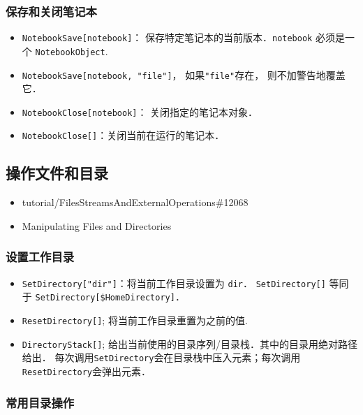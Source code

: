 \subsubsection{保存和关闭笔记本}

\begin{itemize}
\item \verb`NotebookSave[notebook]`： 保存特定笔记本的当前版本．\verb`notebook` 必须是一个 \verb`NotebookObject`.
\item \verb`NotebookSave[notebook, "file"]`， 如果\verb`"file"`存在， 则不加警告地覆盖它．
\item \verb`NotebookClose[notebook]`： 关闭指定的笔记本对象．
\item \verb`NotebookClose[]`：关闭当前在运行的笔记本．
\end{itemize}

\subsection{操作文件和目录}

\begin{itemize}
\item tutorial/FilesStreamsAndExternalOperations\#12068
\item Manipulating Files and Directories
\end{itemize}

\subsubsection{设置工作目录}

\begin{itemize}
\item \verb`SetDirectory["dir"]`：将当前工作目录设置为 \verb`dir`．
\verb`SetDirectory[]` 等同于 \verb`SetDirectory[$HomeDirectory]`．
\item \verb`ResetDirectory[]`; 将当前工作目录重置为之前的值.
\item \verb`DirectoryStack[]`; 给出当前使用的目录序列/目录栈．其中的目录用绝对路径给出．
每次调用\verb`SetDirectory`会在目录栈中压入元素；每次调用\verb`ResetDirectory`会弹出元素．

\end{itemize}

\subsubsection{常用目录操作}

